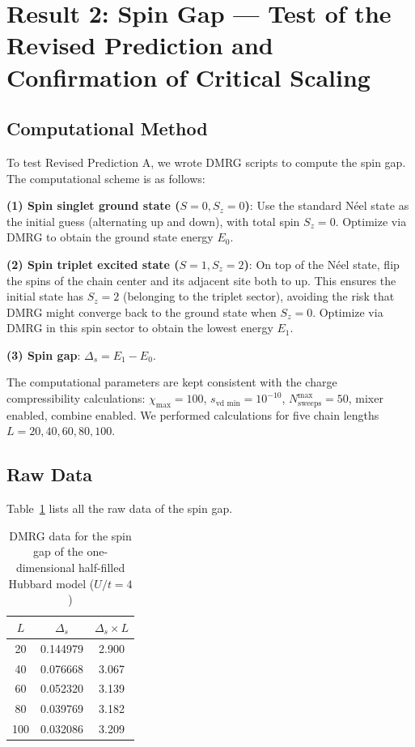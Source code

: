 \documentclass[prb,reprint,twocolumn,superscriptaddress]{revtex4-2}
\begin{document}
\section{Result 2: Spin Gap --- Test of the Revised Prediction and Confirmation of Critical Scaling}\label{sec:spin}

\subsection{Computational Method}

To test Revised Prediction A, we wrote DMRG scripts to compute the spin gap. The computational scheme is as follows:

\textbf{(1) Spin singlet ground state ($S = 0, S_z = 0$)}: Use the standard N\'{e}el state as the initial guess (alternating up and down), with total spin $S_z = 0$. Optimize via DMRG to obtain the ground state energy $E_0$.

\textbf{(2) Spin triplet excited state ($S = 1, S_z = 2$)}: On top of the N\'{e}el state, flip the spins of the chain center and its adjacent site both to up. This ensures the initial state has $S_z = 2$ (belonging to the triplet sector), avoiding the risk that DMRG might converge back to the ground state when $S_z = 0$. Optimize via DMRG in this spin sector to obtain the lowest energy $E_1$.

\textbf{(3) Spin gap}: $\Delta_s = E_1 - E_0$.

The computational parameters are kept consistent with the charge compressibility calculations: $\chi_{\max} = 100$, $s_{\text{vd min}} = 10^{-10}$, $N_{\text{sweeps}}^{\max} = 50$, mixer enabled, combine enabled. We performed calculations for five chain lengths $L = 20, 40, 60, 80, 100$.

\subsection{Raw Data}

Table~\ref{tab:spin_data} lists all the raw data of the spin gap.

\begin{table}[htbp]
\caption{DMRG data for the spin gap of the one-dimensional half-filled Hubbard model ($U/t = 4$)}
\label{tab:spin_data}
\begin{tabular}{ccc}
\toprule
$L$ & $\Delta_s$ & $\Delta_s \times L$ \\
\midrule
20 & 0.144979 & 2.900 \\
40 & 0.076668 & 3.067 \\
60 & 0.052320 & 3.139 \\
80 & 0.039769 & 3.182 \\
100 & 0.032086 & 3.209 \\
\bottomrule
\end{tabular}
\end{table}
\end{document}

